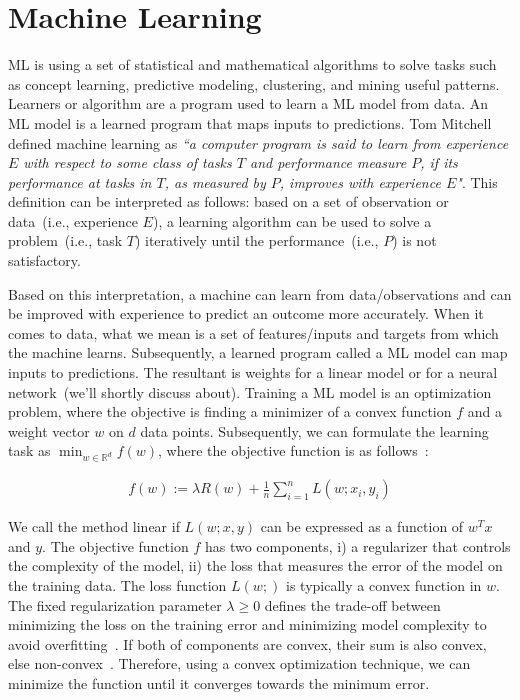 \section{Machine Learning}
ML is using a set of statistical and mathematical algorithms to solve tasks such as concept learning, predictive modeling, clustering, and mining useful patterns. Learners or algorithm are a program used to learn a ML model from data. An ML model is a learned program that maps inputs to predictions. Tom Mitchell~\cite{mitchell1997machine} defined machine learning as \textit{``a computer program is said to learn from experience $E$ with respect to some class of tasks $T$ and performance measure $P$, if its performance at tasks in $T$, as measured by $P$, improves with experience $E$"}. This definition can be interpreted as follows: based on a set of observation or data~(i.e., experience $E$), a learning algorithm can be used to solve a problem~(i.e., task $T$) iteratively until the performance~(i.e., $P$) is not satisfactory. 

\hspace*{3.5mm} Based on this interpretation, a machine can learn from data/observations and can be improved with experience to predict an outcome more accurately. When it comes to data, what we mean is a set of features/inputs and targets from which the machine learns. Subsequently, a learned program called a ML model can map inputs to predictions. The resultant is weights for a linear model or for a neural network~(we'll shortly discuss about). Training a ML model is an optimization problem, where the objective is finding a minimizer of a convex function $f$ and a weight vector $w$ on $d$ data points. Subsequently, we can formulate the learning task as $\min _{w \in \mathbb{R}^{d}} f(w)$, where the objective function is as follows~\cite{karim2018scala}:

\vspace{-4mm}
\begin{align}
    f(w):=\lambda R(w)+\frac{1}{n} \sum_{i=1}^{n} L\left(w ; x_{i}, y_{i}\right)
\end{align}

\hspace*{3.5mm} We call the method linear if $L(w;x,y)$ can be expressed as a function of $w^Tx$ and $y$. The objective function $f$ has two components, i) a regularizer that controls the complexity of the model, ii) the loss that measures the error of the model on the training data. The loss function $L(w;)$ is typically a convex function in $w$. The fixed regularization parameter $\lambda \geq 0$ defines the trade-off between minimizing the loss on the training error and minimizing model complexity to avoid overfitting~\cite{karim2018scala}. If both of components are convex, their sum is also convex, else non-convex~\cite{zaccone2018deep}. Therefore, using a convex optimization technique, we can minimize the function until it converges towards the minimum error.  %

